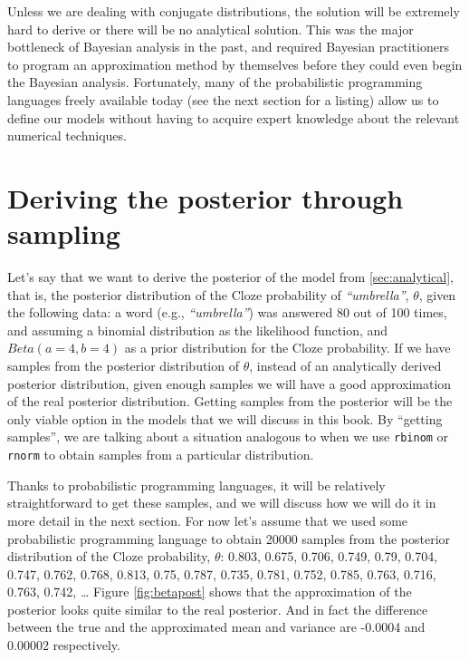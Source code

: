 \documentclass[12pt,]{krantz}
\theoremstyle{definition}
\theoremstyle{definition}
\theoremstyle{definition}
\theoremstyle{remark}
\begin{document}
Unless we are dealing with conjugate distributions, the solution will be
extremely hard to derive or there will be no analytical solution. This
was the major bottleneck of Bayesian analysis in the past, and required
Bayesian practitioners to program an approximation method by themselves
before they could even begin the Bayesian analysis. Fortunately, many of
the probabilistic programming languages freely available today (see the
next section for a listing) allow us to define our models without having
to acquire expert knowledge about the relevant numerical techniques.

\section{Deriving the posterior through sampling}\label{sec:sampling}

Let's say that we want to derive the posterior of the model from
\ref{sec:analytical}, that is, the posterior distribution of the Cloze
probability of \emph{``umbrella''}, \(\theta\), given the following
data: a word (e.g., \emph{``umbrella''}) was answered 80 out of 100
times, and assuming a binomial distribution as the likelihood function,
and \(Beta(a=4,b=4)\) as a prior distribution for the Cloze probability.
If we have samples from the posterior distribution of \(\theta\),
instead of an analytically derived posterior distribution, given enough
samples we will have a good approximation of the real posterior
distribution. Getting samples from the posterior will be the only viable
option in the models that we will discuss in this book. By ``getting
samples'', we are talking about a situation analogous to when we use
\texttt{rbinom} or \texttt{rnorm} to obtain samples from a particular
distribution.

Thanks to probabilistic programming languages, it will be relatively
straightforward to get these samples, and we will discuss how we will do
it in more detail in the next section. For now let's assume that we used
some probabilistic programming language to obtain 20000 samples from the
posterior distribution of the Cloze probability, \(\theta\): 0.803,
0.675, 0.706, 0.749, 0.79, 0.704, 0.747, 0.762, 0.768, 0.813, 0.75,
0.787, 0.735, 0.781, 0.752, 0.785, 0.763, 0.716, 0.763, 0.742, \ldots{}
Figure \ref{fig:betapost} shows that the approximation of the posterior
looks quite similar to the real posterior. And in fact the difference
between the true and the approximated mean and variance are -0.0004 and
0.00002 respectively.
\end{document}
